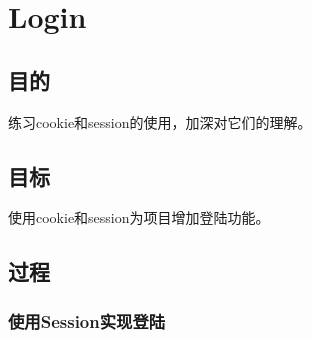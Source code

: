 \chapter{Login}

\section{目的}
练习cookie和session的使用，加深对它们的理解。
\section{目标}
使用cookie和session为项目增加登陆功能。
\section{过程}
\subsection{使用Session实现登陆}
